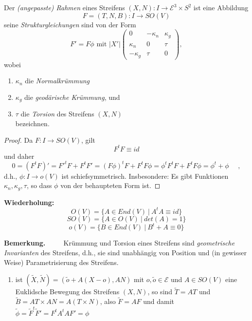 \documentclass[a4paper,oneside,11pt,DIV=12,parskip=half]{scrartcl}
\newcommand{\E}{\mathcal E}
\newenvironment{note}{\textbf{Bemerkung.} ~~~~}{}
\newenvironment{lemma, definition}{\textbf{Lemma und Definition.} ~~~~}{}
\newenvironment{note, example}{\textbf{Bemerkung und Beispiel.} ~~~~}{}
\newenvironment{note, definition}{\textbf{Bemerkung und Definition.} ~~~~}{}
\begin{document}
\begin{lemma, definition}
	
	Der \textit{ (angepasste) Rahmen} eines Streifens $(X,N): I\rightarrow\E^3\times S^2$ ist eine Abbildung \[ F=(T,N,B): I\rightarrow SO(V) \] seine \textit{Strukturgleichungen} sind von der Form \[ F' = F \phi \text{ mit } |X'| \begin{pmatrix}
	0 & - \kappa_n & \kappa_g \\
	\kappa_n & 0 & \tau\\
	-\kappa_g & \tau & 0
	\end{pmatrix}, \] wobei\begin{enumerate}
		\item $\kappa_n$ die \textit{Normalkrümmung}
		\item $\kappa_g$ die \textit{geodärische Krümmung}, und
		\item $\tau$ die \textit{Torsion} des Streifens $(X,N)$ \\ bezeichnen.
		
	\end{enumerate}

\begin{proof}
	Da $F: I \rightarrow SO(V)$, gilt \[F^tF \equiv id\] und daher \[ 0 = (F^tF)' = F'^tF + F^tF' = (F\phi)^tF + F^tF\phi = \phi^tF^tF + F^tF\phi = \phi^t+ \phi ~~~~~~,\] d.h., $\phi:I \rightarrow o(V)$ ist schiefsymmetrisch. Insbesondere: Es gibt Funktionen $\kappa_n, \kappa_g, \tau$, so dass $\phi$ von der behaupteten Form ist.
\end{proof}

\textbf{Wiederholung:}
$$O(V) = \{ A \in End(V) ~ | ~ A^tA\equiv id \}$$
$$SO(V) = \{ A \in O(V) ~ | ~ det(A) = 1 \}$$
$$o(V) = \{ B \in End(V) ~ | ~ B^t +A\equiv 0 \}$$

\begin{note}
	Krümmung und Torsion eines Streifens sind \textit{geometrische Invarianten} des Streifens, d.h., sie sind unabhängig von Position und (in gewisser Weise) Parametrisierung des Streifens.
	
	\begin{enumerate}
		\item ist $(\widetilde{X}, \widetilde{N}) = (\widetilde{o} + A(X-o), AN)$ mit $o,\widetilde{o} \in \E$ und $A \in SO(V)$ eine Euklidsche Bewegung des Streifens $(X,N)$, so sind $\widetilde{T}= AT$ und $\widetilde{B}= AT\times AN = A(T\times N)$, also $\widetilde{F}=AF$ und damit $\widetilde{\phi} = \widetilde{F}^t\widetilde{F}'= F^tA^tAF' = \phi$
		

\end{enumerate}
\end{note}
\end{lemma, definition}
\end{document}
